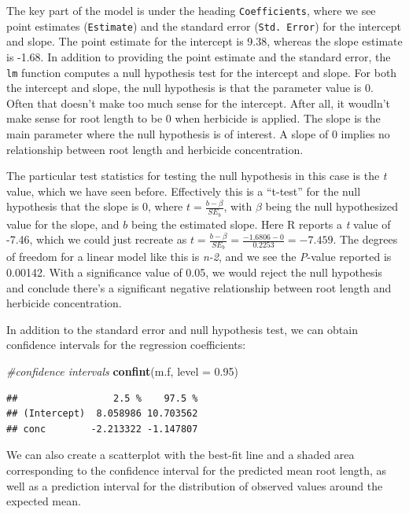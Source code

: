 \documentclass[
]{book}
\newenvironment{Shaded}{\begin{snugshade}}{\end{snugshade}}
\newcommand{\AttributeTok}[1]{\textcolor[rgb]{0.13,0.29,0.53}{#1}}
\newcommand{\CommentTok}[1]{\textcolor[rgb]{0.56,0.35,0.01}{\textit{#1}}}
\newcommand{\FloatTok}[1]{\textcolor[rgb]{0.00,0.00,0.81}{#1}}
\newcommand{\FunctionTok}[1]{\textcolor[rgb]{0.13,0.29,0.53}{\textbf{#1}}}
\newcommand{\NormalTok}[1]{#1}
\begin{document}
The key part of the model is under the heading \texttt{Coefficients}, where we see point estimates (\texttt{Estimate}) and the standard error (\texttt{Std.\ Error}) for the intercept and slope. The point estimate for the intercept is 9.38, whereas the slope estimate is -1.68. In addition to providing the point estimate and the standard error, the \texttt{lm} function computes a null hypothesis test for the intercept and slope. For both the intercept and slope, the null hypothesis is that the parameter value is 0. Often that doesn't make too much sense for the intercept. After all, it woudln't make sense for root length to be 0 when herbicide is applied. The slope is the main parameter where the null hypothesis is of interest. A slope of 0 implies no relationship between root length and herbicide concentration.

The particular test statistics for testing the null hypothesis in this case is the \emph{t} value, which we have seen before. Effectively this is a ``t-test'' for the null hypothesis that the slope is 0, where \(t = \frac{b - \beta}{SE_b}\), with \(\beta\) being the null hypothesized value for the slope, and \(b\) being the estimated slope. Here R reports a \emph{t} value of -7.46, which we could just recreate as \(t = \frac{b - \beta}{SE_b} = \frac{-1.6806 - 0}{0.2253}=-7.459.\) The degrees of freedom for a linear model like this is \emph{n-2}, and we see the \emph{P}-value reported is 0.00142. With a significance value of 0.05, we would reject the null hypothesis and conclude there's a significant negative relationship between root length and herbicide concentration.

In addition to the standard error and null hypothesis test, we can obtain confidence intervals for the regression coefficients:

\begin{Shaded}
\begin{Highlighting}[]
\CommentTok{\#confidence intervals}
\FunctionTok{confint}\NormalTok{(m.f, }\AttributeTok{level =} \FloatTok{0.95}\NormalTok{)}
\end{Highlighting}
\end{Shaded}

\begin{verbatim}
##                 2.5 %    97.5 %
## (Intercept)  8.058986 10.703562
## conc        -2.213322 -1.147807
\end{verbatim}

We can also create a scatterplot with the best-fit line and a shaded area corresponding to the confidence interval for the predicted mean root length, as well as a prediction interval for the distribution of observed values around the expected mean.
\end{document}
